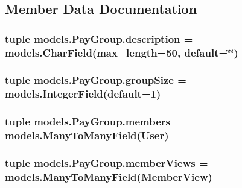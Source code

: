 \subsection{Member Data Documentation}
\hypertarget{classmodels_1_1_pay_group_ae8d4cfe4930ebc6b511f82691026a7d7}{
\subsubsection[{description}]{\setlength{\rightskip}{0pt plus 5cm}tuple models.\-Pay\-Group.\-description = models.\-Char\-Field(max\-\_\-length=50, default=\char`\"{}\char`\"{})\hspace{0.3cm}{\ttfamily [static]}}}\label{classmodels_1_1_pay_group_ae8d4cfe4930ebc6b511f82691026a7d7}
\hypertarget{classmodels_1_1_pay_group_a2ffd41ff089917ffe7350eeae498c356}{
\subsubsection[{group\-Size}]{\setlength{\rightskip}{0pt plus 5cm}tuple models.\-Pay\-Group.\-group\-Size = models.\-Integer\-Field(default=1)\hspace{0.3cm}{\ttfamily [static]}}}\label{classmodels_1_1_pay_group_a2ffd41ff089917ffe7350eeae498c356}
\hypertarget{classmodels_1_1_pay_group_a22c5aadb801b4f26a4c5f675c628cd64}{
\subsubsection[{members}]{\setlength{\rightskip}{0pt plus 5cm}tuple models.\-Pay\-Group.\-members = models.\-Many\-To\-Many\-Field(User)\hspace{0.3cm}{\ttfamily [static]}}}\label{classmodels_1_1_pay_group_a22c5aadb801b4f26a4c5f675c628cd64}
\hypertarget{classmodels_1_1_pay_group_ae13451dcaaa8c881df92549d1e2a3417}{
\subsubsection[{member\-Views}]{\setlength{\rightskip}{0pt plus 5cm}tuple models.\-Pay\-Group.\-member\-Views = models.\-Many\-To\-Many\-Field({\bf Member\-View})\hspace{0.3cm}{\ttfamily [static]}}}\label{classmodels_1_1_pay_group_ae13451dcaaa8c881df92549d1e2a3417}
